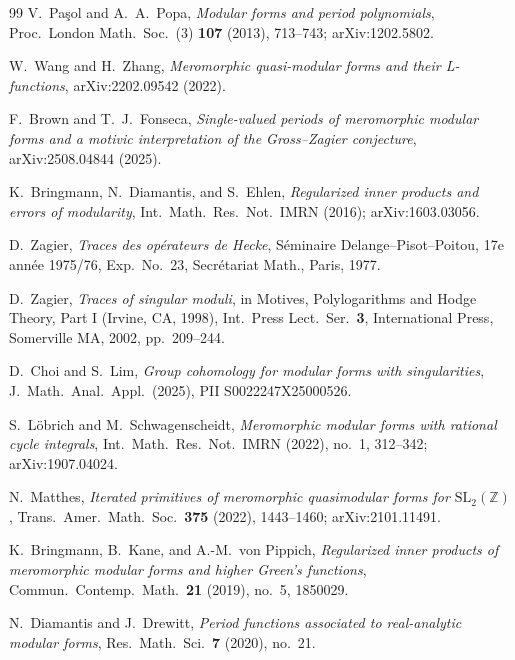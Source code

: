 \documentclass[11pt]{article}
\begin{document}
\begin{thebibliography}{99}
V.\ Pa\c{s}ol and A.\ A.\ Popa,
\emph{Modular forms and period polynomials},
Proc.\ London Math.\ Soc.\ (3) \textbf{107} (2013), 713--743; arXiv:1202.5802.

W.\ Wang and H.\ Zhang,
\emph{Meromorphic quasi-modular forms and their L-functions},
arXiv:2202.09542 (2022).

F.\ Brown and T.\ J.\ Fonseca,
\emph{Single-valued periods of meromorphic modular forms and a motivic
interpretation of the Gross--Zagier conjecture},
arXiv:2508.04844 (2025).

K.\ Bringmann, N.\ Diamantis, and S.\ Ehlen,
\emph{Regularized inner products and errors of modularity},
Int.\ Math.\ Res.\ Not.\ IMRN (2016); arXiv:1603.03056.

D.\ Zagier,
\emph{Traces des op\'erateurs de Hecke},
S\'eminaire Delange--Pisot--Poitou, 17e ann\'ee 1975/76, Exp.\ No.\ 23, Secr\'etariat Math., Paris, 1977.

D.\ Zagier,
\emph{Traces of singular moduli},
in Motives, Polylogarithms and Hodge Theory, Part I (Irvine, CA, 1998),
Int.\ Press Lect.\ Ser.\ \textbf{3}, International Press, Somerville MA, 2002, pp.\ 209--244.

D.\ Choi and S.\ Lim,
\emph{Group cohomology for modular forms with singularities},
J.\ Math.\ Anal.\ Appl.\ (2025), PII S0022247X25000526.

S.\ L\"obrich and M.\ Schwagenscheidt,
\emph{Meromorphic modular forms with rational cycle integrals},
Int.\ Math.\ Res.\ Not.\ IMRN (2022), no.\ 1, 312--342; arXiv:1907.04024.

N.\ Matthes,
\emph{Iterated primitives of meromorphic quasimodular forms for $\mathrm{SL}_2(\mathbb{Z})$},
Trans.\ Amer.\ Math.\ Soc.\ \textbf{375} (2022), 1443--1460; arXiv:2101.11491.

K.\ Bringmann, B.\ Kane, and A.-M.\ von Pippich,
\emph{Regularized inner products of meromorphic modular forms and higher Green's functions},
Commun.\ Contemp.\ Math.\ \textbf{21} (2019), no.\ 5, 1850029.

N.\ Diamantis and J.\ Drewitt,
\emph{Period functions associated to real-analytic modular forms},
Res.\ Math.\ Sci.\ \textbf{7} (2020), no.\ 21.


\end{thebibliography}
\end{document}
